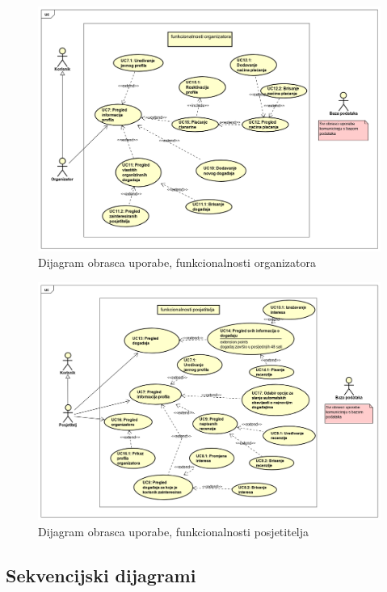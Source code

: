 					\begin{figure}[H]
						\includegraphics[width=\linewidth]{slike/funkcionalnostiOrganizatora.PNG}
						\centering
						\caption{Dijagram obrasca uporabe, funkcionalnosti organizatora}
						\label{fig:UCdijagram3}
					\end{figure}
					
					\begin{figure}[H]
						\includegraphics[width=\linewidth]{slike/funkcionalnostiPosjetitelja.PNG}
						\centering
						\caption{Dijagram obrasca uporabe, funkcionalnosti posjetitelja}
						\label{fig:UCdijagram4}
					\end{figure}
				
				
			
				\eject		
				
			\subsection{Sekvencijski dijagrami}
				

